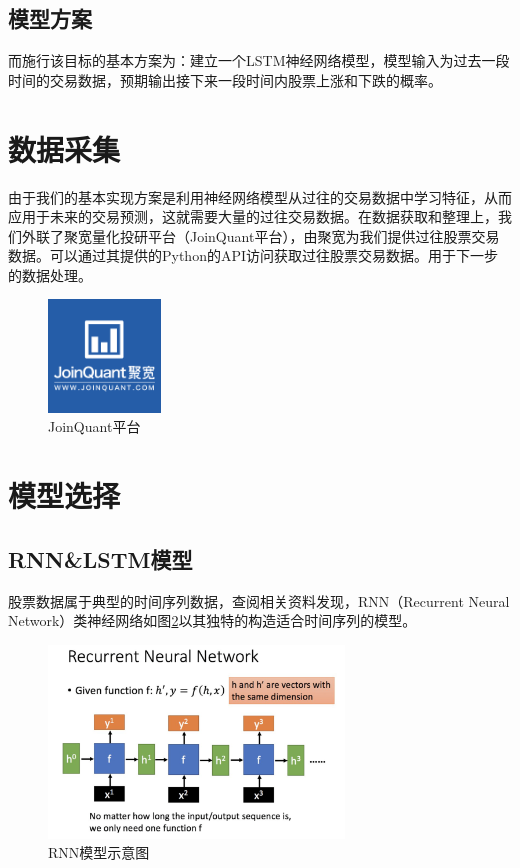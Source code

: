 \documentclass[UTF8]{ctexart}
\begin{document}
\subsection{模型方案}
而施行该目标的基本方案为：建立一个LSTM神经网络模型，模型输入为过去一段时间的交易数据，预期输出接下来一段时间内股票上涨和下跌的概率。

\section{数据采集}
由于我们的基本实现方案是利用神经网络模型从过往的交易数据中学习特征，从而应用于未来的交易预测，这就需要大量的过往交易数据。在数据获取和整理上，我们外联了聚宽量化投研平台（JoinQuant平台），由聚宽为我们提供过往股票交易数据。可以通过其提供的Python的API访问获取过往股票交易数据。用于下一步的数据处理。
\begin{figure}[htbp]
    \centering
    \includegraphics[height = 3cm]{./images/JoinQuant.PNG}
    \caption{JoinQuant平台}
    \label{fig:JQ}
\end{figure}

\section{模型选择}
\subsection{RNN\&LSTM模型}
股票数据属于典型的时间序列数据，查阅相关资料发现，RNN（Recurrent Neural Network）类神经网络如图\ref{fig:RNN}以其独特的构造适合时间序列的模型。
\begin{figure}[h]
    \centering
    \includegraphics[width=0.7\textwidth]{images/RNN.png}
    \caption{RNN模型示意图}
    \label{fig:RNN}
\end{figure}
\end{document}
